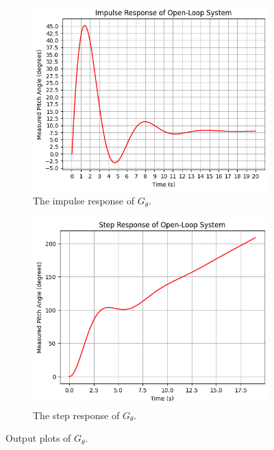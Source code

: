 \documentclass[10pt,a4paper]{article}
\begin{document}
    \begin{figure}
    \centering
        \begin{subfigure}[h]{0.5\textwidth}
            \centering
            \includegraphics[width = \textwidth]{figs/GthetaImpRes.png}
            \caption{The impulse response of $G_\theta$.}
            \label{fig:gThetaImpRes}
        \end{subfigure}%
        \begin{subfigure}[h]{0.5\textwidth}
            \centering
            \includegraphics[width = \textwidth]{figs/GthetaStepRes.png}
            \caption{The step response of $G_\theta$.}
            \label{fig:gThetaStepRes}
        \end{subfigure}
    \caption{Output plots of $G_\theta$.}
    \end{figure}
\end{document}
